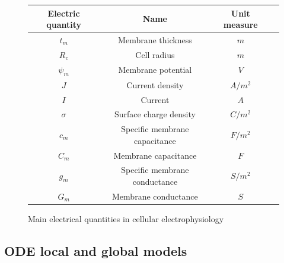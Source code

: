 \documentclass[a4paper]{article}
\begin{document}
\begin{figure}[H]
	\begin{center}
		\begin{tabular}{ |c|c|c|c| } 
			\hline
			\textbf{Electric quantity} & \textbf{Name} & \textbf{Unit measure} \\
			\hline
			$t_m$ & Membrane thickness & $m$ \\ 
			\hline
			$R_c$ & Cell radius & $m$ \\
			\hline
			$\psi_m$ & Membrane potential & $V$ \\
			\hline
			$J$ & Current density & $A/m^2$ \\
			\hline
			$I$ & Current & $A$ \\
			\hline
			$\sigma$ & Surface charge density & $C/m^2$ \\
			\hline
			$c_m$ & Specific membrane capacitance & $F/m^2$ \\
			\hline
			$C_m$ & Membrane capacitance & $F$ \\
			\hline
			$g_m$ & Specific membrane conductance & $S/m^2$ \\
			\hline
			$G_m$ & Membrane conductance & $S$ \\
			
			\hline
		\end{tabular}
		
	\end{center}
	\caption{Main electrical quantities in cellular electrophysiology}
\end{figure}
	
	
\subsection{ODE local and global models}
	
\end{document}
